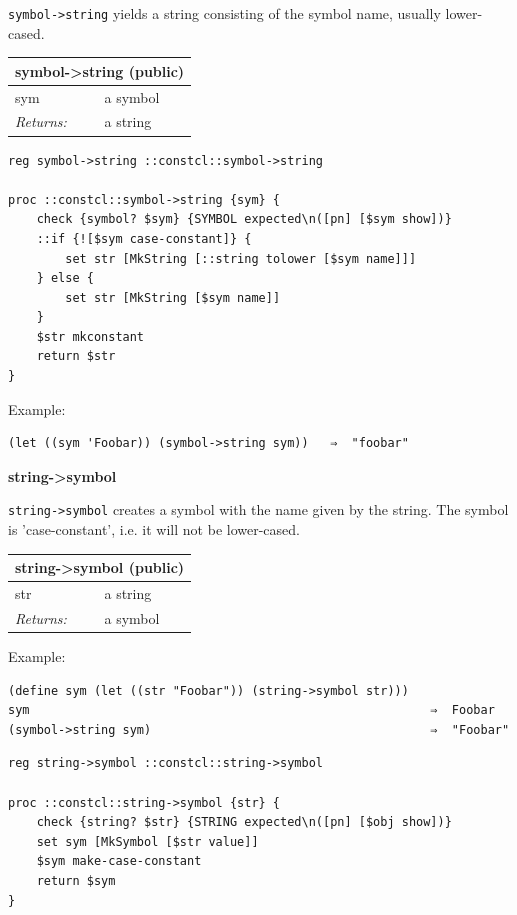 \documentclass[twoside,9pt]{report}
\begin{document}
\texttt{symbol->string} yields a string consisting of the symbol name, usually lower-cased.

\begin{tabular}{ |l l| }
\hline
\multicolumn{2}{|l|}{symbol->string (public)} \\
\hline
sym & a symbol \\
\textit{Returns:} & a string \\
\hline
\end{tabular}

\noindent\makebox[\linewidth]{\rule{\linewidth}{0.4pt}}
\begin{lstlisting}
reg symbol->string ::constcl::symbol->string
 
proc ::constcl::symbol->string {sym} {
    check {symbol? $sym} {SYMBOL expected\n([pn] [$sym show])}
    ::if {![$sym case-constant]} {
        set str [MkString [::string tolower [$sym name]]]
    } else {
        set str [MkString [$sym name]]
    }
    $str mkconstant
    return $str
}
\end{lstlisting}
\noindent\makebox[\linewidth]{\rule{\linewidth}{0.4pt}}

Example:

\noindent\makebox[\linewidth]{\rule{\linewidth}{0.4pt}}
\begin{lstlisting}
(let ((sym 'Foobar)) (symbol->string sym))   ⇒  "foobar"
\end{lstlisting}
\noindent\makebox[\linewidth]{\rule{\linewidth}{0.4pt}}

\textbf{string->symbol}


\texttt{string->symbol} creates a symbol with the name given by the string. The symbol is 'case-constant', i.e. it will not be lower-cased.

\begin{tabular}{ |l l| }
\hline
\multicolumn{2}{|l|}{string->symbol (public)} \\
\hline
str & a string \\
\textit{Returns:} & a symbol \\
\hline
\end{tabular}


Example:

\noindent\makebox[\linewidth]{\rule{\linewidth}{0.4pt}}
\begin{lstlisting}
(define sym (let ((str "Foobar")) (string->symbol str)))
sym                                                        ⇒  Foobar
(symbol->string sym)                                       ⇒  "Foobar"
\end{lstlisting}
\noindent\makebox[\linewidth]{\rule{\linewidth}{0.4pt}}
\noindent\makebox[\linewidth]{\rule{\linewidth}{0.4pt}}
\begin{lstlisting}
reg string->symbol ::constcl::string->symbol
 
proc ::constcl::string->symbol {str} {
    check {string? $str} {STRING expected\n([pn] [$obj show])}
    set sym [MkSymbol [$str value]]
    $sym make-case-constant
    return $sym
}
\end{lstlisting}
\noindent\makebox[\linewidth]{\rule{\linewidth}{0.4pt}}
\end{document}
